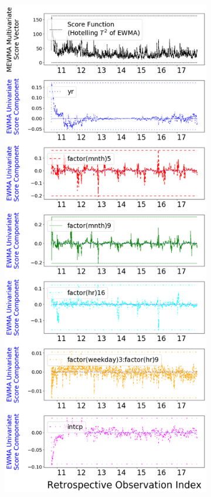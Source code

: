 \documentclass[twoside,11pt]{article}
\begin{document}
\begin{figure}[H]
\centering
    \begin{subfigure}[t]{0.304\linewidth}
     \centering
         \includegraphics[width=1.0\textwidth, trim=.0in .0in .0in .0in, clip]{../figures/v14/bike_sharing/reg_lin_C/PII_pos_single_retro_bike_fisher_mlines_with_regu_1e-08_0_0001_0_01_99_99.png}

\end{subfigure}
\end{figure}
\end{document}
